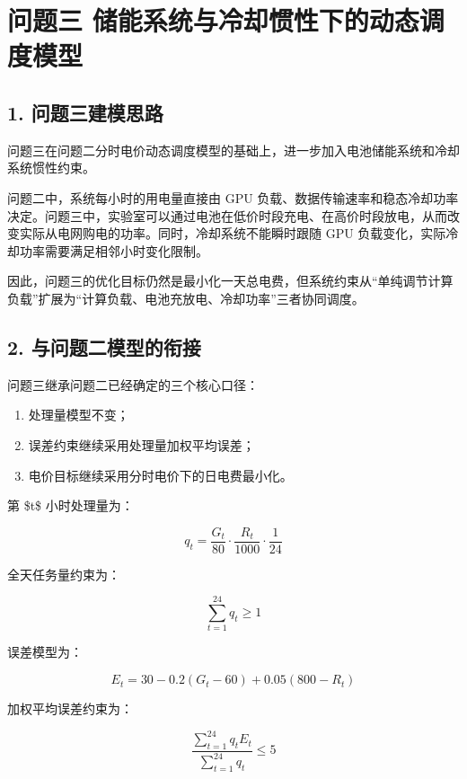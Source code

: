 \documentclass[
]{article}
\author{}
\date{}
\begin{document}
\section{问题三
储能系统与冷却惯性下的动态调度模型}\label{ux95eeux9898ux4e09-ux50a8ux80fdux7cfbux7edfux4e0eux51b7ux5374ux60efux6027ux4e0bux7684ux52a8ux6001ux8c03ux5ea6ux6a21ux578b}

\subsection{1.
问题三建模思路}\label{1-ux95eeux9898ux4e09ux5efaux6a21ux601dux8def}

问题三在问题二分时电价动态调度模型的基础上，进一步加入电池储能系统和冷却系统惯性约束。

问题二中，系统每小时的用电量直接由 GPU
负载、数据传输速率和稳态冷却功率决定。问题三中，实验室可以通过电池在低价时段充电、在高价时段放电，从而改变实际从电网购电的功率。同时，冷却系统不能瞬时跟随
GPU 负载变化，实际冷却功率需要满足相邻小时变化限制。

因此，问题三的优化目标仍然是最小化一天总电费，但系统约束从``单纯调节计算负载''扩展为``计算负载、电池充放电、冷却功率''三者协同调度。

\subsection{2.
与问题二模型的衔接}\label{2-ux4e0eux95eeux9898ux4e8cux6a21ux578bux7684ux8854ux63a5}

问题三继承问题二已经确定的三个核心口径：

\begin{enumerate}
\def\labelenumi{\arabic{enumi}.}
\item
  处理量模型不变；
\item
  误差约束继续采用处理量加权平均误差；
\item
  电价目标继续采用分时电价下的日电费最小化。
\end{enumerate}

第 \$t\$ 小时处理量为：

\[q_t=\frac{G_t}{80}\cdot\frac{R_t}{1000}\cdot\frac{1}{24}\]

全天任务量约束为：

\[\sum_{t=1}^{24}q_t\ge 1\]

误差模型为：

\[E_t=30-0.2(G_t-60)+0.05(800-R_t)\]

加权平均误差约束为：

\[\frac{\sum_{t=1}^{24}q_tE_t}{\sum_{t=1}^{24}q_t}\le 5\]
\end{document}
